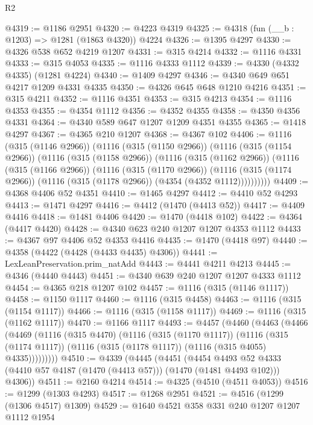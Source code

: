 \begin{lexlean}{R2}
\begin{coremodule}
@4319 := @1186 @2951
@4320 := @4223 @4319
@4325 := @4318 (fun (__b : @1203) => @1281 (@1863 @4320)) @4224
@4326 := @1395 @4297
@4330 := @4326 @538 @652 @4219 @1207
@4331 := @315 @4214
@4332 := @1116 @4331
@4333 := @315 @4053
@4335 := @1116 @4333 @1112
@4339 := @4330 (@4332 @4335) (@1281 @4224)
@4340 := @1409 @4297
@4346 := @4340 @649 @651 @4217 @1209 @4331 @4335
@4350 := @4326 @645 @648 @1210 @4216
@4351 := @315 @4211
@4352 := @1116 @4351
@4353 := @315 @4213
@4354 := @1116 @4353
@4355 := @4354 @1112
@4356 := @4352 @4355
@4358 := @4350 @4356 @4331
@4364 := @4340 @589 @647 @1207 @1209 @4351 @4355
@4365 := @1418 @4297
@4367 := @4365 @210 @1207
@4368 := @4367 @102
@4406 := @1116
    (@315 (@1146 @2966))
    (@1116
      (@315 (@1150 @2966))
      (@1116
        (@315 (@1154 @2966))
        (@1116
          (@315 (@1158 @2966))
          (@1116
            (@315 (@1162 @2966))
            (@1116
              (@315 (@1166 @2966))
              (@1116
                (@315 (@1170 @2966))
                (@1116
                  (@315 (@1174 @2966))
                  (@1116 (@315 (@1178 @2966)) (@4354 (@4352 @1112))))))))))
@4409 := @4368 @4406 @52 @4351
@4410 := @1465 @4297
@4412 := @4410 @52 @4293
@4413 := @1471 @4297
@4416 := @4412 (@1470 (@4413 @52))
@4417 := @4409 @4416
@4418 := @1481 @4406
@4420 := @1470 (@4418 @102)
@4422 := @4364 (@4417 @4420)
@4428 := @4340 @623 @240 @1207 @1207 @4353 @1112
@4433 := @4367 @97 @4406 @52 @4353 @4416
@4435 := @1470 (@4418 @97)
@4440 := @4358 (@4422 (@4428 (@4433 @4435) @4306))
@4441 := LexLeanPreservation.prim_natAdd
@4443 := @4441 @4211 @4213
@4445 := @4346 (@4440 @4443)
@4451 := @4340 @639 @240 @1207 @1207 @4333 @1112
@4454 := @4365 @218 @1207 @102
@4457 := @1116 (@315 (@1146 @1117))
@4458 := @1150 @1117
@4460 := @1116 (@315 @4458)
@4463 := @1116 (@315 (@1154 @1117))
@4466 := @1116 (@315 (@1158 @1117))
@4469 := @1116 (@315 (@1162 @1117))
@4470 := @1166 @1117
@4493 := @4457
    (@4460
      (@4463
        (@4466
          (@4469
            (@1116
              (@315 @4470)
              (@1116
                (@315 (@1170 @1117))
                (@1116
                  (@315 (@1174 @1117))
                  (@1116 (@315 (@1178 @1117)) (@1116 (@315 @4055) @4335)))))))))
@4510 := @4339
    (@4445
      (@4451
        (@4454 @4493 @52 @4333 (@4410 @57 @4187 (@1470 (@4413 @57))) (@1470 (@1481 @4493 @102)))
        @4306))
@4511 := @2160 @4214
@4514 := @4325 (@4510 (@4511 @4053))
@4516 := @1299 (@1303 @4293)
@4517 := @1268 @2951
@4521 := @4516 (@1299 (@1306 @4517) @1309)
@4529 := @1640 @4521 @358 @331 @240 @1207 @1207 @1112 @1954

\end{coremodule}
\end{lexlean}
